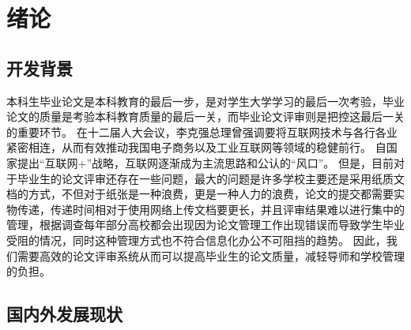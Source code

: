
\chapter{绪论}
\label{chap02}
\section{开发背景}

本科生毕业论文是本科教育的最后一步，是对学生大学学习的最后一次考验，毕业论文的质量是考验本科教育质量的最后一关\cite{.2019}，而毕业论文评审则是把控这最后一关的重要环节。
在十二届人大会议，李克强总理曾强调要将互联网技术与各行各业紧密相连，从而有效推动我国电子商务以及工业互联网等领域的稳健前行\cite{.2020c}。
自国家提出“互联网+”战略，互联网逐渐成为主流思路和公认的“风口”\cite{.20183}。
但是，目前对于毕业生的论文评审还存在一些问题，最大的问题是许多学校主要还是采用纸质文档的方式，不但对于纸张是一种浪费，更是一种人力的浪费，论文的提交都需要实物传递，传递时间相对于使用网络上传文档要更长，并且评审结果难以进行集中的管理\cite{.2017e}，根据调查每年部分高校都会出现因为论文管理工作出现错误而导致学生毕业受阻的情况\cite{.2018}，同时这种管理方式也不符合信息化办公不可阻挡的趋势。
因此，我们需要高效的论文评审系统从而可以提高毕业生的论文质量，减轻导师和学校管理的负担\cite{.2019d}。

\section{国内外发展现状}


